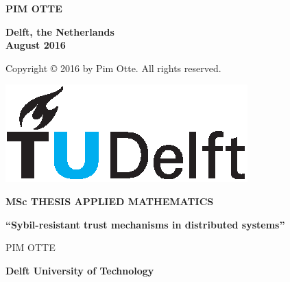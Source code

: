 \documentclass[a4paper,11pt]{book}
\theoremstyle{definition}
\begin{document}
\begin{titlepage}
\begin{center}
\vspace{1cm}

\textbf{PIM OTTE}\\


\textbf{Delft, the Netherlands \\
August 2016} \\

\vspace{1cm}

Copyright \copyright{} 2016 by Pim Otte. All rights reserved.
\end{center}

\end{titlepage}

\newpage

\thispagestyle{empty}

\quad

\newpage

\thispagestyle{empty}

\hspace{10cm}
\begin{minipage}{5cm}
  \includegraphics{tudelft.eps}
\end{minipage}

\begin{center}

\textbf{\large{MSc THESIS APPLIED MATHEMATICS}}

\vspace{1.5cm}

\textbf{``Sybil-resistant trust mechanisms in distributed systems''}
       

\vspace{1.5cm}

PIM OTTE\\

\vspace{1.5cm}

\textbf{\large{Delft University of Technology}}


\end{center}
\end{document}
